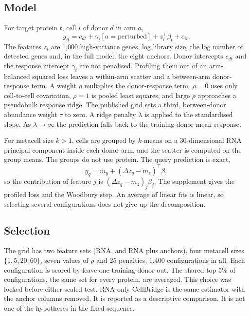 \documentclass[10pt,a4paper]{article}
\begin{document}
\subsection{Model}
For target protein \(t\), cell \(i\) of donor \(d\) in arm \(a\),
\begin{equation}
y_{it}=c_{dt}+\gamma_t[a=\mathrm{perturbed}]+z_i^{\top}\beta_t+e_{it}.
\label{eq:model}
\end{equation}
The features \(z_i\) are 1{,}000 high-variance genes, log library size, the log number of detected genes and, in the full model, the eight anchors. Donor intercepts \(c_{dt}\) and the response intercept \(\gamma_t\) are not penalised. Profiling them out of an arm-balanced squared loss leaves a within-arm scatter and a between-arm donor-response term. A weight \(\rho\) multiplies the donor-response term. \(\rho=0\) uses only cell-to-cell covariation, \(\rho=1\) is pooled least squares, and large \(\rho\) approaches a pseudobulk response ridge. The published grid sets a third, between-donor abundance weight \(\tau\) to zero. A ridge penalty \(\lambda\) is applied to the standardised slope. As \(\lambda\to\infty\) the prediction falls back to the training-donor mean response.

For metacell size \(k>1\), cells are grouped by \(k\)-means on a 30-dimensional RNA principal component inside each donor-arm, and the scatter is computed on the group means. The groups do not use protein. The query prediction is exact,
\begin{equation}
\hat y_q=m_y+(\Delta z_q-m_z)^{\top}\beta,
\label{eq:predict}
\end{equation}
so the contribution of feature \(j\) is \((\Delta z_q-m_z)_j\beta_j\). The supplement gives the profiled loss and the Woodbury step. An average of linear fits is linear, so selecting several configurations does not give up the decomposition.

\subsection{Selection}
The grid has two feature sets (RNA, and RNA plus anchors), four metacell sizes \(\{1,5,20,60\}\), seven values of \(\rho\) and 25 penalties, 1{,}400 configurations in all. Each configuration is scored by leave-one-training-donor-out. The shared top 5\% of configurations, the same set for every protein, are averaged. This choice was locked before either sealed test. RNA-only CellBridge is the same estimator with the anchor columns removed. It is reported as a descriptive comparison. It is not one of the hypotheses in the fixed sequence.
\end{document}
